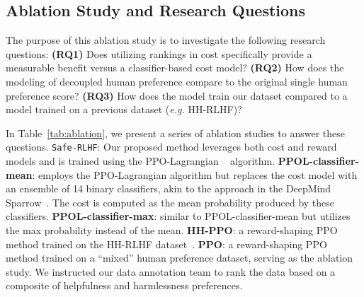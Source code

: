 \documentclass{article}
\begin{document}
\subsection{Ablation Study and Research Questions}
\label{sec:ablation_study}
\vspace{-0.5em}

The purpose of this ablation study is to investigate the following research questions: \textbf{(RQ1)} Does utilizing rankings in cost specifically provide a measurable benefit versus a classifier-based cost model? \textbf{(RQ2)} How does the modeling of decoupled human preference compare to the original single human preference score? \textbf{(RQ3)} How does the model train our dataset compared to a model trained on a previous dataset (\textit{e.g.} HH-RLHF)? 

\begin{table}[h]
\centering
\caption{Model Win Rates against Alpaca-7B (Evaluated by prompted GPT-4)}
\label{tab:ablation}
\vspace{-1em}
\end{table}


In Table~\ref{tab:ablation}, we present a series of ablation studies to answer these questions.
\texttt{Safe-RLHF}: Our proposed method leverages both cost and reward models and is trained using the PPO-Lagrangian ~\cite{ray2019benchmarking, ji2023safetygymnasium} algorithm.
\textbf{PPOL-classifier-mean}: employs the PPO-Lagrangian algorithm but replaces the cost model with an ensemble of 14 binary classifiers, akin to the approach in the DeepMind Sparrow~\cite{glaese2022improving}. The cost is computed as the mean probability produced by these classifiers.
\textbf{PPOL-classifier-max}: similar to PPOL-classifier-mean but utilizes the max probability instead of the mean.
\textbf{HH-PPO}: a reward-shaping PPO method trained on the HH-RLHF dataset~\cite{Ganguli2022-td}.
\textbf{PPO}: a reward-shaping PPO method trained on a ``mixed'' human preference dataset, serving as the ablation study. We instructed our data annotation team to rank the data based on a composite of helpfulness and harmlessness preferences.
\end{document}
